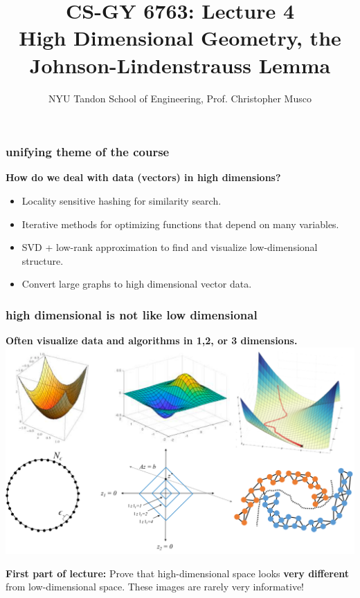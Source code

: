 \documentclass[compress]{beamer}
\title{CS-GY 6763: Lecture 4 \\  High Dimensional Geometry, the Johnson-Lindenstrauss Lemma}
\author{NYU Tandon School of Engineering, Prof. Christopher Musco}
\date{}
\begin{document}
\begin{frame}
	\titlepage 
\end{frame}


\begin{frame}
	\frametitle{unifying theme of the course}
	\begin{center}
		\textbf{How do we deal with data (vectors) in high dimensions?}
	\end{center}
\begin{itemize}
	\item Locality sensitive hashing for similarity search.  
	\item Iterative methods for optimizing functions that depend on many variables.
	\item SVD + low-rank approximation to find and visualize low-dimensional structure.
	\item Convert large graphs to high dimensional vector data.
\end{itemize}
\end{frame}

\begin{frame}
	\frametitle{high dimensional is not like low dimensional}
	\begin{center}
		\textbf{Often visualize data and algorithms in 1,2, or 3 dimensions.}
		\includegraphics[width=.8\textwidth]{lowdim_visualizations.png}
		
		\textbf{First part of lecture:} Prove that high-dimensional space looks \textbf{\alert{very different}} from low-dimensional space. These images are rarely very informative! 
	\end{center}
\end{frame}
\end{document}
